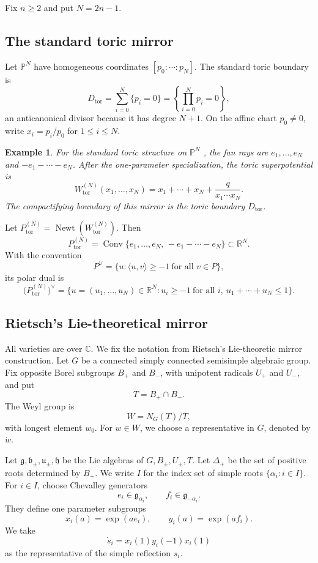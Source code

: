 \documentclass{article}
\newtheorem{exam}[thm]{Example}
\newcommand{\RR}{\mathbb{R}}
\newcommand{\CC}{\mathbb{C}}
\newcommand{\PP}{\mathbb{P}}
\begin{document}
Fix \(n\ge2\) and put \(N=2n-1\).

\subsection{The standard toric mirror}

Let \(\PP^N\) have homogeneous coordinates \([p_0:\cdots:p_N]\). The standard
toric boundary is
\[
D_{\mathrm{tor}}
=
\sum_{i=0}^N\{p_i=0\}
=
\left\{\prod_{i=0}^N p_i=0\right\},
\]
an anticanonical divisor because it has degree \(N+1\). On the affine chart
\(p_0\ne 0\), write \(x_i=p_i/p_0\) for \(1\leq i\leq N\).

\begin{exam}\label{ex:tor-PN}
For the standard toric structure on \(\PP^N\) \cite{Bat93,Givental,Givental98,HV}, the fan rays are
\(e_1,\ldots,e_N\) and \(-e_1-\cdots-e_N\). After the one-parameter
specialization, the toric superpotential is
\[
W_{\mathrm{tor}}^{(N)}(x_1,\ldots,x_N)
=
x_1+\cdots+x_N+\frac{q}{x_1\cdots x_N}.
\]
The compactifying boundary of this mirror is the toric boundary
\(D_{\mathrm{tor}}\).
\end{exam}

Let \(P_{\mathrm{tor}}^{(N)}=\operatorname{Newt}(W_{\mathrm{tor}}^{(N)})\). Then
\[
P_{\mathrm{tor}}^{(N)}
=
\operatorname{Conv}\{e_1,\ldots,e_N,\,-e_1-\cdots-e_N\}
\subset \RR^N.
\]
With the convention
\[
P^\vee=\{u:\langle u,v\rangle\ge -1\ \text{for all }v\in P\},
\]
its polar dual is
\[
\bigl(P_{\mathrm{tor}}^{(N)}\bigr)^\vee
=
\{u=(u_1,\ldots,u_N)\in\RR^N:
u_i\ge -1\ \text{for all }i,\ 
u_1+\cdots+u_N\le1\}.
\]

\subsection{Rietsch's Lie-theoretical mirror}

All varieties are over \(\CC\). We fix the notation from Rietsch's Lie-theoretic mirror construction. Let \(G\) be a connected simply connected semisimple algebraic group. Fix opposite Borel subgroups \(B_+\) and \(B_-\), with unipotent radicals \(U_+\) and \(U_-\), and put
\[
T=B_+\cap B_-.
\]
The Weyl group is
\[
W=N_G(T)/T,
\]
with longest element \(w_0\). For \(w\in W\), we choose a representative in \(G\), denoted by \(\dot w\).

Let \(\mathfrak g,\mathfrak b_\pm,\mathfrak u_\pm,\mathfrak h\) be the Lie algebras of \(G,B_\pm,U_\pm,T\). Let \(\Delta_+\) be the set of positive roots determined by \(B_+\). We write \(I\) for the index set of simple roots \(\{\alpha_i:i\in I\}\). For \(i\in I\), choose Chevalley generators
\[
e_i\in\mathfrak g_{\alpha_i},
\qquad
f_i\in\mathfrak g_{-\alpha_i}.
\]
They define one parameter subgroups
\[
x_i(a)=\exp(ae_i),
\qquad
y_i(a)=\exp(af_i).
\]
We take
\[
\dot s_i=x_i(1)y_i(-1)x_i(1)
\]
as the representative of the simple reflection \(s_i\).
\end{document}
